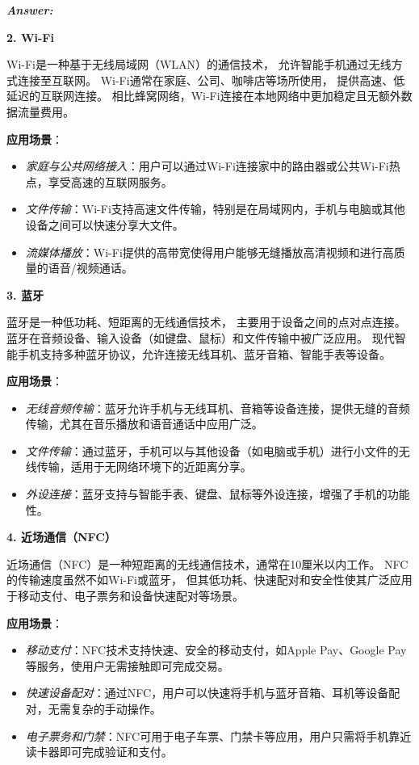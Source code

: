 \documentclass[12pt]{article}
\newenvironment{Answer}{
  \vspace{12pt}
  {\large\textbf{\textit{\hspace{-12pt}Answer:}}}\par
  \vspace{8pt}
} {\vspace{24pt}}
\begin{document}
\begin{Answer}
\noindent\textbf{2. Wi-Fi}\noindent

Wi-Fi是一种基于无线局域网（WLAN）的通信技术，
允许智能手机通过无线方式连接至互联网。
Wi-Fi通常在家庭、公司、咖啡店等场所使用，
提供高速、低延迟的互联网连接。
相比蜂窝网络，Wi-Fi连接在本地网络中更加稳定且无额外数据流量费用。

\textbf{应用场景}：
\begin{itemize}
    \item \textit{家庭与公共网络接入}：用户可以通过Wi-Fi连接家中的路由器或公共Wi-Fi热点，享受高速的互联网服务。
    \item \textit{文件传输}：Wi-Fi支持高速文件传输，特别是在局域网内，手机与电脑或其他设备之间可以快速分享大文件。
    \item \textit{流媒体播放}：Wi-Fi提供的高带宽使得用户能够无缝播放高清视频和进行高质量的语音/视频通话。
\end{itemize}

\noindent\textbf{3. 蓝牙}\noindent

蓝牙是一种低功耗、短距离的无线通信技术，
主要用于设备之间的点对点连接。
蓝牙在音频设备、输入设备（如键盘、鼠标）和文件传输中被广泛应用。
现代智能手机支持多种蓝牙协议，允许连接无线耳机、蓝牙音箱、智能手表等设备。

\textbf{应用场景}：
\begin{itemize}
    \item \textit{无线音频传输}：蓝牙允许手机与无线耳机、音箱等设备连接，提供无缝的音频传输，尤其在音乐播放和语音通话中应用广泛。
    \item \textit{文件传输}：通过蓝牙，手机可以与其他设备（如电脑或手机）进行小文件的无线传输，适用于无网络环境下的近距离分享。
    \item \textit{外设连接}：蓝牙支持与智能手表、键盘、鼠标等外设连接，增强了手机的功能性。
\end{itemize}

\noindent\textbf{4. 近场通信（NFC）}\noindent

近场通信（NFC）是一种短距离的无线通信技术，通常在10厘米以内工作。
NFC的传输速度虽然不如Wi-Fi或蓝牙，
但其低功耗、快速配对和安全性使其广泛应用于移动支付、电子票务和设备快速配对等场景。

\textbf{应用场景}：
\begin{itemize}
    \item \textit{移动支付}：NFC技术支持快速、安全的移动支付，如Apple Pay、Google Pay等服务，使用户无需接触即可完成交易。
    \item \textit{快速设备配对}：通过NFC，用户可以快速将手机与蓝牙音箱、耳机等设备配对，无需复杂的手动操作。
    \item \textit{电子票务和门禁}：NFC可用于电子车票、门禁卡等应用，用户只需将手机靠近读卡器即可完成验证和支付。
\end{itemize}


\end{Answer}
\end{document}
